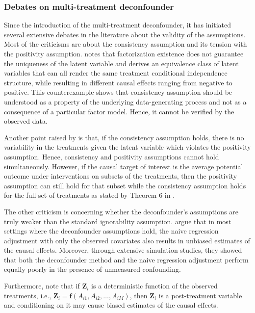 \subsubsection{Debates on multi-treatment deconfounder}

Since the introduction of the multi-treatment deconfounder, it has initiated several extensive 
debates in the literature about the validity of the assumptions. Most of the criticisms are about the 
consistency assumption and its tension with the positivity assumption. 
 notes that factorization existence does not guarantee 
the uniqueness of the latent variable and derives an equivalence class of 
latent variables that can all render the same treatment conditional independence structure,
while 
resulting in different causal effects ranging from negative to positive. This counterexample shows 
that consistency assumption should be understood as a property of the underlying 
data-generating process and not as a consequence of a particular factor model. Hence, 
it cannot be verified by the observed data. 

Another point raised by  
is that, if the consistency assumption holds, %
there is no variability 
in the treatments given the latent variable which violates the positivity assumption. Hence, 
consistency and positivity assumptions cannot hold simultaneously.  
However, if the causal target of interest is the average potential 
outcome under interventions on subsets of the treatments, then the positivity assumption can still 
hold 
for that subset while the consistency assumption holds for the full set of treatments as 
stated by Theorem 6 in . 

The other criticism is concerning whether the deconfounder's assumptions are truly weaker than the standard 
ignorability assumption.  argue that in most settings where
the deconfounder assumptions hold, the naive regression adjustment with only the 
observed covariates also results in unbiased estimates of the causal effects. Moreover, through 
extensive simulation studies, they showed 
that both the deconfounder method and the naive regression adjustment perform equally poorly in the presence 
of unmeasured confounding. 

Furthermore,  note that if $\mathbf{Z}_i$ is 
a deterministic function of the observed treatments, i.e., $\mathbf{Z}_i = \mathbf{f}(A_{i1}, A_{i2}, \ldots, A_{iM})$, 
then $\mathbf{Z}_i$ is a post-treatment variable and conditioning on it may cause biased estimates of 
the causal effects. 

